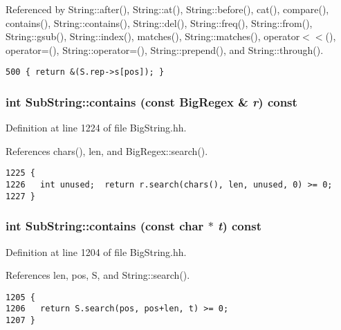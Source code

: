 Referenced by String::after(), String::at(), String::before(), cat(), compare(), contains(), String::contains(), String::del(), String::freq(), String::from(), String::gsub(), String::index(), matches(), String::matches(), operator$<$$<$(), operator=(), String::operator=(), String::prepend(), and String::through().



\footnotesize\begin{verbatim}500 { return &(S.rep->s[pos]); }
\end{verbatim}\normalsize 
{}
\subsubsection{\setlength{\rightskip}{0pt plus 5cm}int Sub\-String::contains (const {\bf Big\-Regex} \& {\em r}) const\hspace{0.3cm}{\tt  [inline]}}\label{classSubString_a9}




Definition at line 1224 of file Big\-String.hh.

References chars(), len, and Big\-Regex::search().



\footnotesize\begin{verbatim}1225 {
1226   int unused;  return r.search(chars(), len, unused, 0) >= 0;
1227 }
\end{verbatim}\normalsize 
{}
\subsubsection{\setlength{\rightskip}{0pt plus 5cm}int Sub\-String::contains (const char $\ast$ {\em t}) const\hspace{0.3cm}{\tt  [inline]}}\label{classSubString_a8}




Definition at line 1204 of file Big\-String.hh.

References len, pos, S, and String::search().



\footnotesize\begin{verbatim}1205 {   
1206   return S.search(pos, pos+len, t) >= 0;
1207 }
\end{verbatim}\normalsize 
{}
